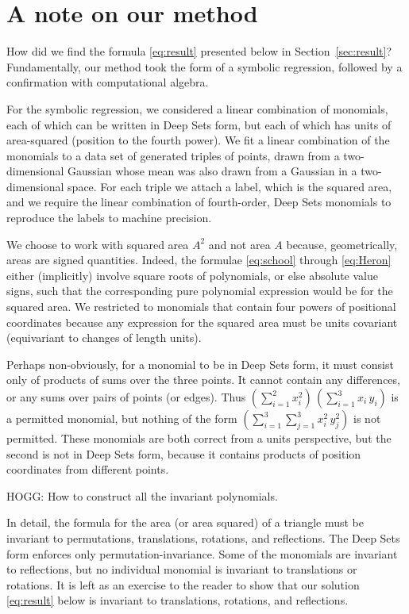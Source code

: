\documentclass[12pt]{article}
\newcommand{\sectionname}{Section}
\newcommand{\secref}[1]{\sectionname~\ref{#1}}
\begin{document}
\section{A note on our method}\label{sec:method}
How did we find the formula \eqref{eq:result} presented below in \secref{sec:result}?
Fundamentally, our method took the form of a symbolic regression, followed by a confirmation with computational algebra.

For the symbolic regression, we considered a linear combination of monomials, each of which can be written in Deep Sets form, but each of which has units of area-squared (position to the fourth power).
We fit a linear combination of the monomials to a data set of generated triples of points, drawn from a two-dimensional Gaussian whose mean was also drawn from a Gaussian in a two-dimensional space.
For each triple we attach a label, which is the squared area, and we require the linear combination of fourth-order, Deep Sets monomials to reproduce the labels to machine precision.

We choose to work with squared area $A^2$ and not area $A$ because, geometrically, areas are signed quantities.
Indeed, the formulae \eqref{eq:school} through \eqref{eq:Heron} either (implicitly) involve square roots of polynomials, or else absolute value signs, such that the corresponding pure polynomial expression would be for the squared area.
We restricted to monomials that contain four powers of positional coordinates because any expression for the squared area must be units covariant (equivariant to changes of length units).

Perhaps non-obviously, for a monomial to be in Deep Sets form, it must consist only of products of sums over the three points.
It cannot contain any differences, or any sums over pairs of points (or edges).
Thus $(\sum_{i=1}^2 x_i^2)\,(\sum_{i=1}^3 x_i\,y_i)$ is a permitted monomial, but nothing of the form $(\sum_{i=1}^3\sum_{j=1}^3 x_i^2\,y_j^2)$ is not permitted.
These monomials are both correct from a units perspective, but the second is not in Deep Sets form, because it contains products of position coordinates from different points.

HOGG: How to construct all the invariant polynomials.

In detail, the formula for the area (or area squared) of a triangle must be invariant to permutations, translations, rotations, and reflections.
The Deep Sets form enforces only permutation-invariance.
Some of the monomials are invariant to reflections, but no individual monomial is invariant to translations or rotations.
It is left as an exercise to the reader to show that our solution \eqref{eq:result} below is invariant to translations, rotations, and reflections.
\end{document}
